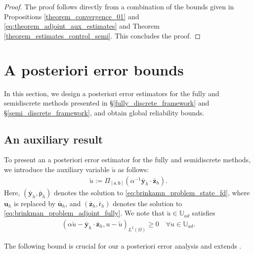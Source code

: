 \documentclass[final]{siamart0216}
\begin{document}
\begin{proof}
The proof follows directly from a combination of the bounds given in Propositions \ref{theorem_convergence_01} and \ref{eq:theorem_adjoint_aux_estimates} and Theorem \ref{theorem_estimates_control_semi}. This concludes the proof.
\end{proof}

\section{A posteriori error bounds}
In this section, we design a posteriori error estimators for the fully and semidiscrete methods presented in \S\ref{fully_discrete_framework} and \S\ref{semi_discrete_framework}, and obtain global reliability bounds.


\subsection{An auxiliary result}
To present an a posteriori error estimator for the fully and semidiscrete methods, we introduce the auxiliary variable $\breve{u}$ as follows:
\begin{align}\label{eq:representation_aux}
\breve{u}:= \Pi_{[\mathsf{a},\mathsf{b}]}(\alpha^{-1}\bar{\mathbf{y}}_{h}\cdot\bar{\mathbf{z}}_{h}).
\end{align}
Here, $(\bar{\mathbf{y}}_{h},\bar{\mathsf{p}}_{h})$ denotes the solution to \eqref{eq:brinkamn_problem_state_fd}, where $\mathbf{u}_h$ is replaced by $\bar{\mathbf{u}}_h$, and $(\bar{\mathbf{z}}_{h},\bar{\mathsf{r}}_{h})$ denotes the solution to \eqref{eq:brinkman_problem_adjoint_fully}. We note that $\breve{u}\in\mathbb{U}_{ad}$ satisfies \cite[Lemma 2.26]{MR2583281}
\begin{eqnarray}\label{eq:variational_inequality_discrete_aux}
(\alpha \breve{u}-\bar{\mathbf{y}}_{h}\cdot \bar{\mathbf{z}}_{h},u-\breve{u})_{L^2(\Omega)}\geq 0\quad\forall u\in \mathbb{U}_{ad}.
\end{eqnarray}

The following bound is crucial for our a posteriori error analysis and extends \cite{MR4450052}.
\end{document}
